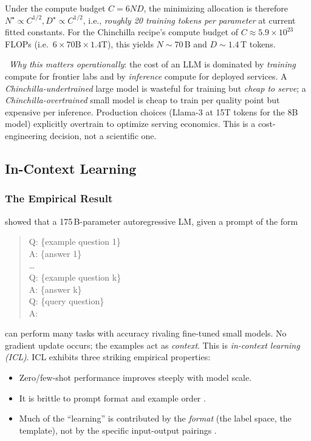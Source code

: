 Under the compute budget $C = 6 N D$, the minimizing allocation is
therefore $N^\star \propto C^{1/2}, D^\star \propto C^{1/2}$, i.e.,
\emph{roughly 20 training tokens per parameter} at current fitted
constants. For the Chinchilla recipe's compute budget of
$C \approx 5.9 \times 10^{23}$ FLOPs (i.e.\ $6 \times 70\text{B}
\times 1.4\text{T}$), this yields $N \sim 70$\,B and $D \sim 1.4$\,T
tokens.

\Heur\ \emph{Why this matters operationally}: the cost of an LLM is
dominated by \emph{training} compute for frontier labs and by
\emph{inference} compute for deployed services. A
\emph{Chinchilla-undertrained} large model is wasteful for training
but \emph{cheap to serve}; a \emph{Chinchilla-overtrained} small
model is cheap to train per quality point but expensive per
inference. Production choices (Llama-3 at 15T tokens for the 8B
model) explicitly overtrain to optimize serving economics. This is a
cost-engineering decision, not a scientific one.

\subsection{In-Context Learning}

\subsubsection{The Empirical Result}

\citet{brown2020language} showed that a 175\,B-parameter
autoregressive LM, given a prompt of the form
\begin{quote}\small\ttfamily
Q: \{example question 1\}\\
A: \{answer 1\}\\
\ldots\\
Q: \{example question k\}\\
A: \{answer k\}\\
Q: \{query question\}\\
A:
\end{quote}
can perform many tasks with accuracy rivaling fine-tuned small models.
No gradient update occurs; the examples act as \emph{context}. This
is \emph{in-context learning (ICL)}. ICL exhibits three striking
empirical properties:
\begin{itemize}
  \item Zero/few-shot performance improves steeply with model scale.
  \item It is brittle to prompt format and example order
        \citep{lu2022fantastically}.
  \item Much of the ``learning'' is contributed by the \emph{format}
        (the label space, the template), not by the specific input-output
        pairings \citep{min2022rethinking}.
\end{itemize}

